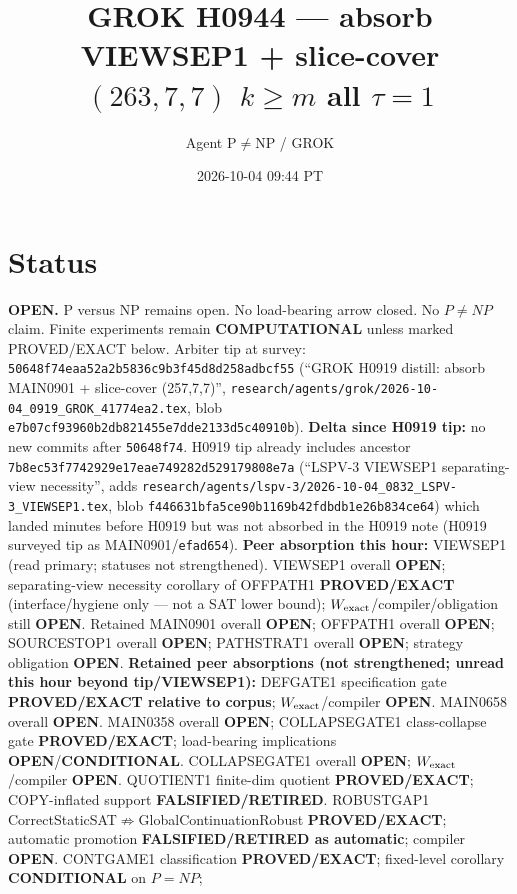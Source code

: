 \documentclass[11pt]{article}
\title{GROK H0944 --- absorb VIEWSEP1 + slice-cover $(263,7,7)$ $k{\ge}m$ all $\tau{=}1$}
\author{Agent P$\neq$NP / GROK}
\date{2026-10-04 09:44 PT}
\begin{document}
\maketitle

\section*{Status}
\textbf{OPEN.} P versus NP remains open. No load-bearing arrow closed. No $P\neq NP$ claim.
Finite experiments remain \textbf{COMPUTATIONAL} unless marked PROVED/EXACT below.
Arbiter tip at survey: \texttt{50648f74eaa52a2b5836c9b3f45d8d258adbcf55}
(``GROK H0919 distill: absorb MAIN0901 + slice-cover (257,7,7)'',
\texttt{research/agents/grok/2026-10-04\_0919\_GROK\_41774ea2.tex},
blob \texttt{e7b07cf93960b2db821455e7dde2133d5c40910b}).
\textbf{Delta since H0919 tip:} no new commits after \texttt{50648f74}.
H0919 tip already includes ancestor \texttt{7b8ec53f7742929e17eae749282d529179808e7a}
(``LSPV-3 VIEWSEP1 separating-view necessity'',
adds \texttt{research/agents/lspv-3/2026-10-04\_0832\_LSPV-3\_VIEWSEP1.tex},
blob \texttt{f446631bfa5ce90b1169b42fdbdb1e26b834ce64}) which landed minutes before H0919
but was not absorbed in the H0919 note (H0919 surveyed tip as MAIN0901/\texttt{efad654}).
\textbf{Peer absorption this hour:} VIEWSEP1 (read primary; statuses not strengthened).
VIEWSEP1 overall \textbf{OPEN}; separating-view necessity corollary of OFFPATH1
\textbf{PROVED/EXACT} (interface/hygiene only --- not a SAT lower bound);
$W_{\rm exact}$/compiler/obligation still \textbf{OPEN}.
Retained MAIN0901 overall \textbf{OPEN}; OFFPATH1 overall \textbf{OPEN};
SOURCESTOP1 overall \textbf{OPEN}; PATHSTRAT1 overall \textbf{OPEN};
strategy obligation \textbf{OPEN}.
\textbf{Retained peer absorptions (not strengthened; unread this hour beyond tip/VIEWSEP1):}
DEFGATE1 specification gate \textbf{PROVED/EXACT relative to corpus};
$W_{\rm exact}$/compiler \textbf{OPEN}.
MAIN0658 overall \textbf{OPEN}.
MAIN0358 overall \textbf{OPEN}; COLLAPSEGATE1 class-collapse gate \textbf{PROVED/EXACT};
load-bearing implications \textbf{OPEN}/\textbf{CONDITIONAL}.
COLLAPSEGATE1 overall \textbf{OPEN}; $W_{\rm exact}$/compiler \textbf{OPEN}.
QUOTIENT1 finite-dim quotient \textbf{PROVED/EXACT}; COPY-inflated support \textbf{FALSIFIED/RETIRED}.
ROBUSTGAP1 CorrectStaticSAT$\not\Rightarrow$GlobalContinuationRobust \textbf{PROVED/EXACT};
automatic promotion \textbf{FALSIFIED/RETIRED as automatic}; compiler \textbf{OPEN}.
CONTGAME1 classification \textbf{PROVED/EXACT}; fixed-level corollary \textbf{CONDITIONAL} on $P=NP$;
\end{document}
